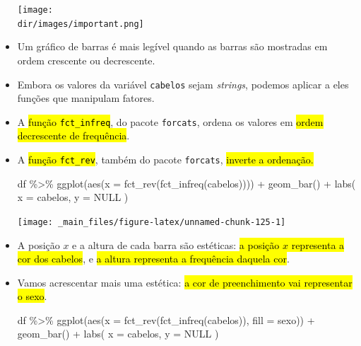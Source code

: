 \documentclass[
  11pt]{report}
\newenvironment{Shaded}{\begin{snugshade}}{\end{snugshade}}
\newcommand{\AttributeTok}[1]{\textcolor[rgb]{0.77,0.63,0.00}{#1}}
\newcommand{\ConstantTok}[1]{\textcolor[rgb]{0.00,0.00,0.00}{#1}}
\newcommand{\FunctionTok}[1]{\textcolor[rgb]{0.00,0.00,0.00}{#1}}
\newcommand{\NormalTok}[1]{#1}
\newcommand{\SpecialCharTok}[1]{\textcolor[rgb]{0.00,0.00,0.00}{#1}}
\newcommand{\StringTok}[1]{\textcolor[rgb]{0.31,0.60,0.02}{#1}}
\newcommand{\dir}{/ssd/R/x86_64-pc-linux-gnu-library/4.1/fnaufelRmd/rmarkdown/resources}
\newenvironment{rmdimportant}
{
  \begin{myimportant}
    \texttt{[image: \\dir/images/important.png]}
    \tcblower
  }
  {
  \end{myimportant}
}
\renewenvironment{Shaded}{
    \begin{mdframed}[%
      roundcorner=2pt,%
      innerleftmargin=5pt,%
      innerrightmargin=5pt,%
      topline=true,%
      leftline=true,%
      rightline=true,%
      bottomline=true,%
      linewidth=0.5pt,%
      linecolor=black!20,%
      backgroundcolor=black!2,%
      skipabove=2ex,%
      skipbelow=2.5ex%
    ]%
  }
  {
    \end{mdframed}
  }
\begin{document}
\begin{itemize}
\begin{rmdimportant}
  \end{rmdimportant}
\item
  Um gráfico de barras é mais legível quando as barras são mostradas em ordem crescente ou decrescente.
\item
  Embora os valores da variável \texttt{cabelos} sejam \emph{strings}, podemos aplicar a eles funções que manipulam fatores.
\item
  A {\hl{função {\mbox{\texttt{fct\_infreq}}}}}, do pacote \texttt{forcats}, ordena os valores em {\hl{ordem decrescente de frequência}}.
\item
  A {\hl{função {\mbox{\texttt{fct\_rev}}}}}, também do pacote \texttt{forcats}, {\hl{inverte a ordenação.}}

\begin{Shaded}
\begin{Highlighting}[]
\NormalTok{df }\SpecialCharTok{\%\textgreater{}\%} 
  \FunctionTok{ggplot}\NormalTok{(}\FunctionTok{aes}\NormalTok{(}\AttributeTok{x =} \FunctionTok{fct\_rev}\NormalTok{(}\FunctionTok{fct\_infreq}\NormalTok{(cabelos)))) }\SpecialCharTok{+}
    \FunctionTok{geom\_bar}\NormalTok{() }\SpecialCharTok{+}
    \FunctionTok{labs}\NormalTok{(}
      \AttributeTok{x =} \StringTok{\textquotesingle{}cabelos\textquotesingle{}}\NormalTok{,}
      \AttributeTok{y =} \ConstantTok{NULL}
\NormalTok{    )}
\end{Highlighting}
\end{Shaded}

  \begin{center}\texttt{[image: \_main\_files/figure-latex/unnamed-chunk-125-1]} \end{center}
\item
  A posição $x$ e a altura de cada barra são estéticas: {\hl{a posição $x$ representa a cor dos cabelos}}, e {\hl{a altura representa a frequência daquela cor}}.
\item
  Vamos acrescentar mais uma estética: {\hl{a cor de preenchimento vai representar o sexo}}.

\begin{Shaded}
\begin{Highlighting}[]
\NormalTok{df }\SpecialCharTok{\%\textgreater{}\%} 
  \FunctionTok{ggplot}\NormalTok{(}\FunctionTok{aes}\NormalTok{(}\AttributeTok{x =} \FunctionTok{fct\_rev}\NormalTok{(}\FunctionTok{fct\_infreq}\NormalTok{(cabelos)), }\AttributeTok{fill =}\NormalTok{ sexo)) }\SpecialCharTok{+}
    \FunctionTok{geom\_bar}\NormalTok{() }\SpecialCharTok{+}
    \FunctionTok{labs}\NormalTok{(}
      \AttributeTok{x =} \StringTok{\textquotesingle{}cabelos\textquotesingle{}}\NormalTok{,}
      \AttributeTok{y =} \ConstantTok{NULL}
\NormalTok{    )}
\end{Highlighting}
\end{Shaded}


\end{itemize}
\end{document}

